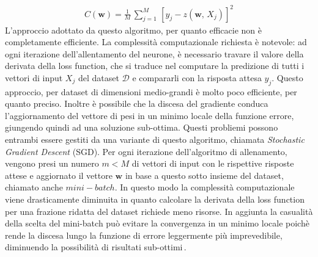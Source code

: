 % 
\begin{gather*}
    C(\mathbf{w}) = \frac{1}{M}\,\sum_{j = 1}^M\,{\left[ y_j - z(\mathbf{w},\,X_j) \right]}^2
\end{gather*}
% 
\noindent L'approccio adottato da questo algoritmo, per quanto efficacie non è completamente efficiente. La complessità computazionale richiesta è notevole: ad ogni iterazione dell'allentamento del neurone, è necessario travare il valore della derivata della loss function, che si traduce nel computare la predizione di tutti i vettori di input $X_j$ del dataset $\mathcal{D}$ e compararli con la risposta attesa $y_j$. Questo approccio, per dataset di dimensioni medio-grandi è molto poco efficiente, per quanto preciso. Inoltre è possibile che la discesa del gradiente conduca l'aggiornamento del vettore di pesi in un minimo locale della funzione errore, giungendo quindi ad una soluzione sub-ottima. Questi probliemi possono entrambi essere gestiti da una variante di questo algoritmo, chiamata \textit{Stochastic Gradient Descent} (\acs{SGD}). Per ogni iterazione dell'algoritmo di allenamento, vengono presi un numero $m < M$ di vettori di input con le rispettive risposte attese e aggiornato il vettore $\mathbf{w}$ in base a questo sotto insieme del dataset, chiamato anche $mini-batch$. In questo modo la complessità computazionale viene drasticamente diminuita in quanto calcolare la derivata della loss function per una frazione ridatta del dataset richiede meno risorse. In aggiunta la casualità della scelta del mini-batch può evitare la convergenza in un minimo locale poichè rende la discesa lungo la funzione di errore leggermente più imprevedibile, diminuendo la possibilità di risultati sub-ottimi\,\cite{lu2022gradient, andrychowicz2016learning, nielsen2015neural}.

